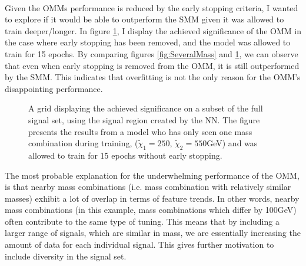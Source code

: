 \\
Given the \ac{OMM}s performance is reduced by the early stopping criteria, I wanted to explore if it would be able to outperform the 
\ac{SMM} given it was allowed to train deeper/longer. In figure \ref{fig:NNOverfitting}, I display the achieved significance
of the \ac{OMM} in the case where early stopping has been removed, and the model was allowed to train for 15 epochs. By comparing figures 
\ref{fig:SeveralMass} and \ref{fig:NNOverfitting}, we can observe that even when early stopping is removed from the \ac{OMM}, it is  
still outperformed by the \ac{SMM}. This indicates that overfitting is not the only reason for the \ac{OMM}'s disappointing performance.\\
\begin{figure}
    \centering
    \caption[A grid displaying the achieved significance on a subset of the full signal set, using the signal region 
    created by a dense \ac{NN} which has trained on one mass, and has been allowed to train for 16 epochs.]{
    A grid displaying the achieved significance on a subset of the full signal set, using the signal region 
    created by the \ac{NN}. The figure presents the results from a model who has only seen one mass combination 
    during training, ($\tilde{\chi}_1=250$, $\tilde{\chi}_2=550$GeV) and was allowed to train for 15 epochs without 
    early stopping.}
    \label{fig:NNOverfitting}
\end{figure}
The most probable explanation for the underwhelming performance of the \ac{OMM}, is that nearby mass combinations (i.e. mass combination with 
relatively similar masses) exhibit a lot of overlap in terms of feature trends. In other words, nearby mass combinations (in this example, mass combinations which 
differ by 100GeV) often contribute to the same type of tuning. This means that by including a larger range of signals, which are similar in mass, we are 
essentially increasing the amount of data for each individual signal. This gives further motivation to include diversity in the signal set.